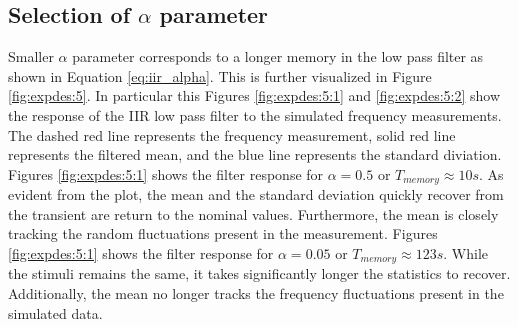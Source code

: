 \subsection{Selection of $\alpha$ parameter}\label{subsec:selectrion-ofparameter}
Smaller $\alpha$ parameter corresponds to a longer memory in the low pass filter as shown in Equation \ref{eq:iir_alpha}.
This is further visualized in Figure \ref{fig:expdes:5}.
In particular this Figures \ref{fig:expdes:5:1} and \ref{fig:expdes:5:2} show the response of the IIR low pass filter to the simulated frequency measurements.
The dashed red line represents the frequency measurement, solid red line represents the filtered mean, and the blue line represents the standard diviation.
Figures \ref{fig:expdes:5:1} shows the filter response for $\alpha = 0.5$ or $T_{memory} \approx 10s $.
As evident from the plot, the mean and the standard deviation quickly recover from the transient are return to the nominal values.
Furthermore, the mean is closely tracking the random fluctuations present in the measurement.
Figures \ref{fig:expdes:5:1} shows the filter response for $\alpha = 0.05$ or $T_{memory} \approx 123s $.
While the stimuli remains the same, it takes significantly longer the statistics to recover.
Additionally, the mean no longer tracks the frequency fluctuations present in the simulated data.

